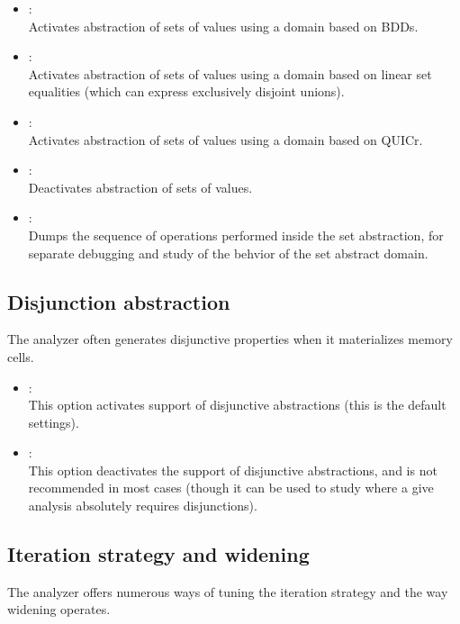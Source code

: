 \begin{itemize}
\item[\doption{-setd-on}] \optadv: \\
  Activates abstraction of sets of values using a domain based on BDDs.
\item[\doption{-setd-lin}] \optadv: \\
  Activates abstraction of sets of values using a domain based on linear
  set equalities (which can express exclusively disjoint unions).
\item[\doption{-setd-quicr}] \optadv: \\
  Activates abstraction of sets of values using a domain based on QUICr.
\item[\doption{-setd-off}] \optadv: \\
  Deactivates abstraction of sets of values.
\item[\doption{-dump-ops}] \optdev: \\
  Dumps the sequence of operations performed inside the set abstraction,
  for separate debugging and study of the behvior of the set abstract
  domain.
\end{itemize}

\subsection{Disjunction abstraction}
\label{s:opt:disjd}
The \memcad analyzer often generates disjunctive properties when it
materializes memory cells.
\begin{itemize}
\item[\doption{-disj-on}]: \\
  This option activates support of disjunctive abstractions (this is the
  default settings).
\item[\doption{-disj-off}]: \\
  This option deactivates the support of disjunctive abstractions, and is
  not recommended in most cases (though it can be used to study where a
  give analysis absolutely requires disjunctions).
\end{itemize}

\subsection{Iteration strategy and widening}
\label{s:opt:iter}
The \memcad analyzer offers numerous ways of tuning the iteration
strategy and the way widening operates.


